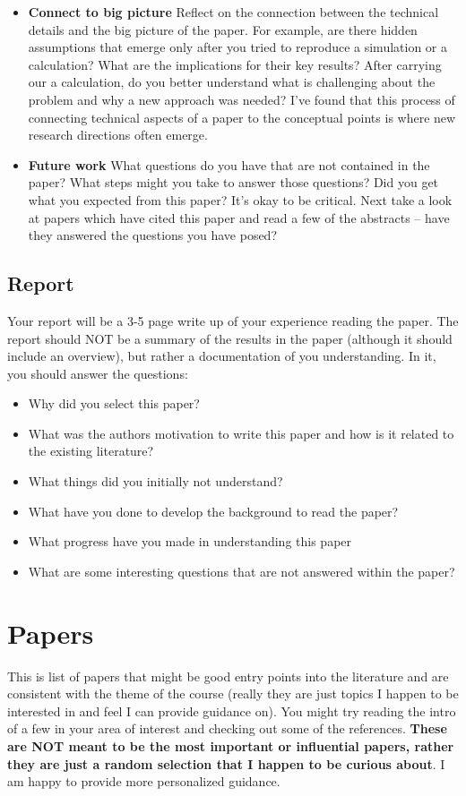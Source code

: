 \documentclass{amsart}
\begin{document}
\begin{itemize}
\begin{itemize}
\end{itemize}
\item  {\bf Connect to big picture} Reflect on the connection between the technical details and the big picture of the paper. For example, are there hidden assumptions that emerge only after you tried to reproduce a simulation or a calculation? What are the implications for their key results? After carrying our a calculation, do you better understand what is challenging about the problem and why a new approach was needed? I've found that this process of connecting technical aspects of a paper to the conceptual points is where new research directions often emerge. 
\item  {\bf Future work}  What questions do you have that are not contained in the paper?  What steps might you take to answer those questions? Did you get what you expected from this paper? It's okay to be critical. Next take a look at papers which have cited this paper and read a few of the abstracts -- have they answered the questions you have posed?
\end{itemize}

\subsection{Report}

Your report will be a 3-5 page write up of your experience reading the paper. The report should NOT be a summary of the results in the paper (although it should include an overview), but rather a documentation of you understanding. In it, you should answer the questions:
\begin{itemize}
\item  Why did you select this paper?   
\item  What was the authors motivation to write this paper and how is it related to the existing literature? 
\item  What things did you initially not understand? 
\item  What have you done to develop the background to read the paper? 
\item  What progress have you made in understanding this paper 
\item  What are some interesting questions that are not answered within the paper?   
\end{itemize}

\section{Papers}\label{sec:papers}
This is list of papers that might be good entry points into the literature and are consistent with the theme of the course (really they are just topics I happen to be interested in and feel I can provide guidance on). You might try reading the intro of a few in your area of interest and checking out some of the references. {\bf These are NOT meant to be the most important or influential papers, rather they are just a random selection that I happen to be curious about}.   I am happy to provide more personalized guidance. 
\end{document}
